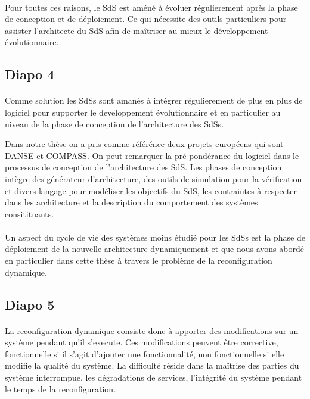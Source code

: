 \paragraph{}
Pour toutes ces raisons, le SdS est améné à évoluer régulierement
après la phase de conception et de déploiement. Ce qui nécessite des
outils particuliers pour assister l'architecte du SdS afin de maîtriser au
mieux le développement évolutionnaire. 
  
\subsection{Diapo 4}

\paragraph{}
Comme solution les SdSs sont amanés à intégrer régulierement de plus
en plus de logiciel pour supporter le developpement évolutionnaire et
en particulier au niveau de la phase de conception de l'architecture
des SdSs.

Dans notre thèse on a pris comme référénce deux
projets européens qui sont DANSE et COMPASS. On peut remarquer la
pré-pondérance du logiciel dans le processus de conception de
l'architecture des SdS.
Les phases de conception intègre des générateur d'architecture, 
des outils de simulation pour la vérification et divers langage pour
modéliser les objectifs du SdS, les contraintes à respecter dans les
architecture et la description du comportement des systèmes
consitituants. 

\paragraph{} 
Un aspect du cycle de vie des systèmes moins étudié pour les SdSs est
la phase de déploiement de la nouvelle architecture dynamiquement et que nous avons
abordé en particulier dans cette thèse à travers le problème de la
reconfiguration dynamique.

\subsection{Diapo 5}

\paragraph{}
La reconfiguration dynamique consiste donc à apporter des
modifications sur un système pendant qu'il s'execute. Ces
modifications peuvent être corrective, fonctionnelle si il s'agit
d'ajouter une fonctionnalité, non fonctionnelle si elle modifie la
qualité du système.  La difficulté réside dans la maîtrise des parties
du système interrompue, les dégradations de services, l'intégrité du
système pendant le temps de la reconfiguration. 

